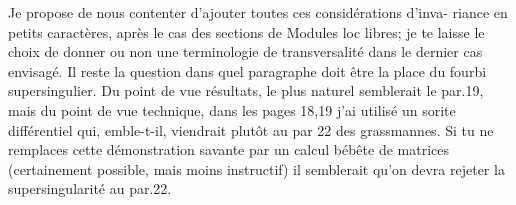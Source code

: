 Je propose de nous contenter d'ajouter toutes ces considérations d'inva-%
riance en petits caractères, après le cas des sections de Modules loc libres;
je te laisse le choix de donner ou non une terminologie de transversalité dans
le dernier cas envisagé. Il reste la question dans quel paragraphe doit être
la place du fourbi supersingulier. Du point de vue résultats, le plus naturel
semblerait le par.19, mais du point de vue technique, dans les pages 18,19
j'ai utilisé un sorite différentiel qui, emble-t-il, viendrait plutôt au par
22 des grassmannes. Si tu ne remplaces cette démonstration savante par un
calcul bébête de matrices (certainement possible, mais moins instructif) il
semblerait qu'on devra rejeter la supersingularité au par.22.

